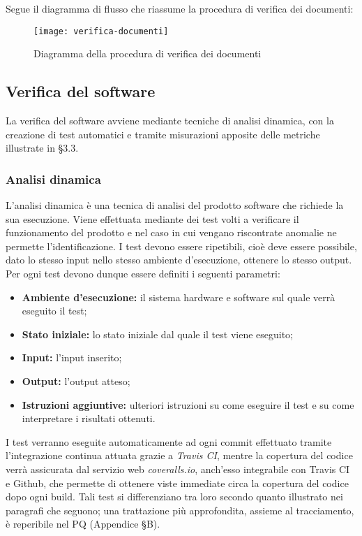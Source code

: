\documentclass[../NormediProgetto.tex]{subfiles}
\begin{document}
Segue il diagramma di flusso che riassume la procedura di verifica dei documenti:

\begin{figure}[H]
	\texttt{[image: verifica-documenti]}
	\centering
	\caption{Diagramma della procedura di verifica dei documenti}
\end{figure}

\subsection{Verifica del software}

La verifica del software avviene mediante tecniche di analisi dinamica, con la creazione di test automatici e tramite misurazioni apposite delle metriche illustrate in §3.3.

\subsubsection{Analisi dinamica}

L’analisi dinamica è una tecnica di analisi del prodotto software che richiede la sua esecuzione. Viene effettuata mediante dei test volti a verificare il funzionamento del prodotto e nel caso in cui vengano riscontrate anomalie ne permette l’identificazione. I test devono essere ripetibili, cioè deve essere possibile, dato lo stesso input nello stesso ambiente d'esecuzione, ottenere lo stesso output. Per ogni test devono dunque essere definiti i seguenti parametri:

\begin{itemize}
    \item \textbf{Ambiente d'esecuzione:} il sistema hardware e software sul quale verrà eseguito il test;
    \item \textbf{Stato iniziale:} lo stato iniziale dal quale il test viene eseguito;
    \item \textbf{Input:} l’input inserito;
    \item \textbf{Output:} l’output atteso;
    \item \textbf{Istruzioni aggiuntive:} ulteriori istruzioni su come eseguire il test e su come interpretare i risultati ottenuti.
\end{itemize}

I test verranno eseguite automaticamente ad ogni commit effettuato tramite l'integrazione continua attuata grazie a \textit{Travis CI}, mentre la copertura del codice verrà assicurata dal servizio web \textit{coveralls.io}, anch'esso integrabile con Travis CI e Github, che permette di ottenere viste immediate circa la copertura del codice dopo ogni build. Tali test si differenziano tra loro secondo quanto illustrato nei paragrafi che seguono; una
trattazione più approfondita, assieme al tracciamento, è reperibile nel PQ (Appendice §B).
\end{document}
